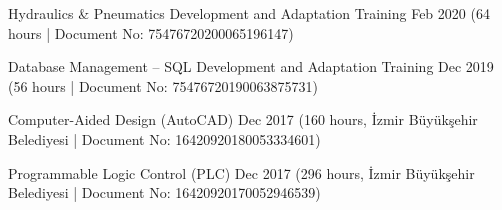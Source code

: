 \vspace{-3mm}

\begin{cventries}

  \cventry
    {Hydraulics \& Pneumatics Development and Adaptation Training} %
    {} %
    {} %
    {Feb 2020} %
    {\scriptsize\color{lighttext}(64 hours | Document No: 75476720200065196147)}

  \cventry
    {Database Management -- SQL Development and Adaptation Training} %
    {} %
    {} %
    {Dec 2019} %
    {\scriptsize\color{lighttext}(56 hours | Document No: 75476720190063875731)}

\end{cventries}

\vspace{-3mm}

\begin{cventries}

  \cventry
    {Computer-Aided Design (AutoCAD)} %
    {} %
    {} %
    {Dec 2017} %
    {\scriptsize\color{lighttext}(160 hours, İzmir Büyükşehir Belediyesi | Document No: 16420920180053334601)}

  \cventry
    {Programmable Logic Control (PLC)} %
    {} %
    {} %
    {Dec 2017} %
    {\scriptsize\color{lighttext}(296 hours, İzmir Büyükşehir Belediyesi | Document No: 16420920170052946539)}

\end{cventries}

